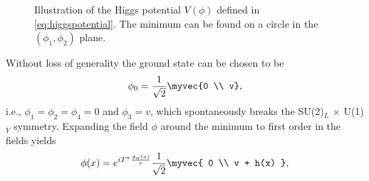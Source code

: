 \begin{figure}[t]
  \caption[Illustration of the Higgs potential.]{Illustration of the Higgs potential $V(\phi)$ defined in \cref{eq:higgspotential}. The minimum can be found on a circle in the $(\phi_1, \phi_2)$ plane.
  }
  \label{fig:higgspotential}
\end{figure}
Without loss of generality the ground state can be chosen to be
\begin{equation}
  \phi_0 = \frac{1}{\sqrt{2}} \myvec{0 \\ v},
  \label{eq:groundstate}
\end{equation}
i.e., $\phi_1 = \phi_2 = \phi_4 = 0$ and $\phi_3 = v$, which spontaneously breaks the SU(2)$_L$ $\times$ U(1)$_Y$ symmetry.
Expanding the field $\phi$ around the minimum to first order in the fields yields
\begin{equation}
  \phi(x) = e^{iT^a\frac{\phi_a(x)}{v}}\frac{1}{\sqrt{2}} \myvec{ 0 \\ v + h(x) },
  \label{eq:higgsexp}
\end{equation}

